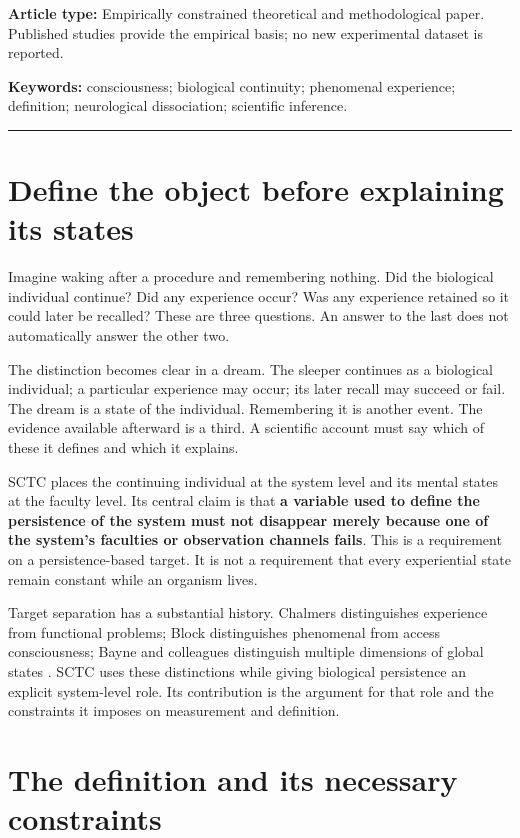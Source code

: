 \documentclass[11pt,letterpaper]{article}
\begin{document}
{\small\textbf{Article type:} Empirically constrained theoretical and methodological paper. Published studies provide the empirical basis; no new experimental dataset is reported.\par}
{\small\textbf{Keywords:} consciousness; biological continuity; phenomenal experience; definition; neurological dissociation; scientific inference.\par}
\vspace{0.25em}
\noindent\textcolor{linegray}{\rule{\linewidth}{0.45pt}}
\vspace{0.25em}

\section{Define the object before explaining its states}
Imagine waking after a procedure and remembering nothing. Did the biological individual continue? Did any experience occur? Was any experience retained so it could later be recalled? These are three questions. An answer to the last does not automatically answer the other two.

The distinction becomes clear in a dream. The sleeper continues as a biological individual; a particular experience may occur; its later recall may succeed or fail. The dream is a state of the individual. Remembering it is another event. The evidence available afterward is a third. A scientific account must say which of these it defines and which it explains.

SCTC places the continuing individual at the system level and its mental states at the faculty level. Its central claim is that \textbf{a variable used to define the persistence of the system must not disappear merely because one of the system's faculties or observation channels fails}. This is a requirement on a persistence-based target. It is not a requirement that every experiential state remain constant while an organism lives.

Target separation has a substantial history. Chalmers distinguishes experience from functional problems; Block distinguishes phenomenal from access consciousness; Bayne and colleagues distinguish multiple dimensions of global states \cite{Chalmers1995,Block1995,Bayne2016}. SCTC uses these distinctions while giving biological persistence an explicit system-level role. Its contribution is the argument for that role and the constraints it imposes on measurement and definition.

\section{The definition and its necessary constraints}
\end{document}
